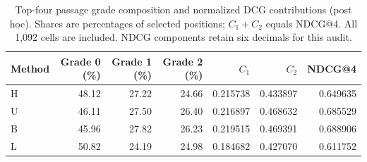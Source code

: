 \begin{table}[htbp]\centering\small
\caption{Top-four passage grade composition and normalized DCG contributions (post hoc). Shares are percentages of selected positions; $C_1+C_2$ equals NDCG@4. All 1,092 cells are included. NDCG components retain six decimals for this audit.}\label{tab:gradecomposition2}
\begin{tabular}{lrrrrrr}\toprule
Method & Grade 0 (\%) & Grade 1 (\%) & Grade 2 (\%) & $C_1$ & $C_2$ & NDCG@4\\\midrule
H & 48.12 & 27.22 & 24.66 & 0.215738 & 0.433897 & 0.649635\\
U & 46.11 & 27.50 & 26.40 & 0.216897 & 0.468632 & 0.685529\\
B & 45.96 & 27.82 & 26.23 & 0.219515 & 0.469391 & 0.688906\\
L & 50.82 & 24.19 & 24.98 & 0.184682 & 0.427070 & 0.611752\\
\bottomrule\end{tabular}\end{table}
